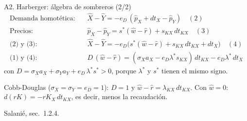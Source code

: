 \documentclass[aspectratio=169,11pt]{beamer}
\newcommand{\fuente}[1]{\par\vfill{\small\color{cGris}#1\par}}
\begin{document}
\begin{frame}{A2. Harberger: álgebra de sombreros (2/2)}
  \small
  \begin{align*}
    \text{Demanda homotética:}\quad & \hat X - \hat Y = -e_D\,(\hat p_X + dt_X - \hat p_Y) \quad (2)\\
    \text{Precios:}\quad & \hat p_X - \hat p_Y = s^*(\hat w - \hat r) + s_{KX}\,dt_{KX} \quad (3)\\
    \text{(2) y (3):}\quad & \hat X - \hat Y = -e_D\big(s^*(\hat w - \hat r) + s_{KX}\,dt_{KX} + dt_X\big) \quad (4)\\
    \text{(1) y (4):}\quad & D\,(\hat w - \hat r) = (\sigma_X a_X - e_D\lambda^* s_{KX})\,dt_{KX} - e_D\lambda^*\,dt_X
  \end{align*}
  con $D = \sigma_X a_X + \sigma_Y a_Y + e_D\,\lambda^* s^* > 0$, porque $\lambda^*$ y $s^*$ tienen el mismo signo.
  \par\medskip
  Cobb-Douglas ($\sigma_X=\sigma_Y=e_D=1$): $D=1$ y $\hat w - \hat r = \lambda_{KX}\,dt_{KX}$. Con $\hat w = 0$: $d(rK) = -rK_X\,dt_{KX}$, es decir, menos la recaudación.
  \fuente{Salanié, sec.~1.2.4.}
\end{frame}
\end{document}
